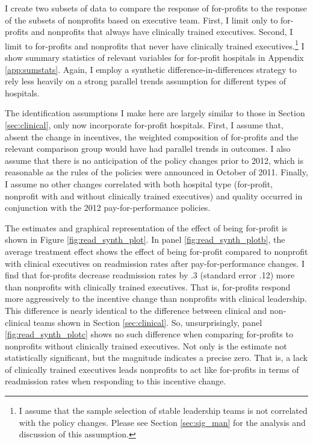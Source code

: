 \documentclass[12pt]{article}
\begin{document}
    I create two subsets of data to compare the response of for-profits to the response of the subsets of nonprofits based on executive team. First, I limit only to for-profits and nonprofits that always have clinically trained executives. Second, I limit to for-profits and nonprofits that never have clinically trained executives.\footnote{I assume that the sample selection of stable leadership teams is not correlated with the policy changes. Please see Section \ref{sec:sig_man} for the analysis and discussion of this assumption.} I show summary statistics of relevant variables for for-profit hospitals in Appendix \ref{app:sumstats}. Again, I employ a synthetic difference-in-differences strategy to rely less heavily on a strong parallel trends assumption for different types of hospitals. 

    The identification assumptions I make here are largely similar to those in Section \ref{sec:clinical}, only now incorporate for-profit hospitals. First, I assume that, absent the change in incentives, the weighted composition of for-profits and the relevant comparison group would have had parallel trends in outcomes. I also assume that there is no anticipation of the policy changes prior to 2012, which is reasonable as the rules of the policies were announced in October of 2011. Finally, I assume no other changes correlated with both hospital type (for-profit, nonprofit with and without clinically trained executives) and quality occurred in conjunction with the 2012 pay-for-performance policies.

    The estimates and graphical representation of the effect of being for-profit is shown in Figure \ref{fig:read_synth_plot}. In panel \ref{fig:read_synth_plotb}, the average treatment effect shows the effect of being for-profit compared to nonprofit with clinical executives on readmission rates after pay-for-performance changes. I find that for-profits decrease readmission rates by .3 (standard error .12) more than nonprofits with clinically trained executives. That is, for-profits respond more aggressively to the incentive change than nonprofits with clinical leadership. This difference is nearly identical to the difference between clinical and non-clinical teams shown in Section \ref{sec:clinical}. So, unsurprisingly, panel \ref{fig:read_synth_plotc} shows no such difference when comparing for-profits to nonprofits without clinically trained executives. Not only is the estimate not statistically significant, but the magnitude indicates a precise zero. That is, a lack of clinically trained executives leads nonprofits to act like for-profits in terms of readmission rates when responding to this incentive change. 
\end{document}
